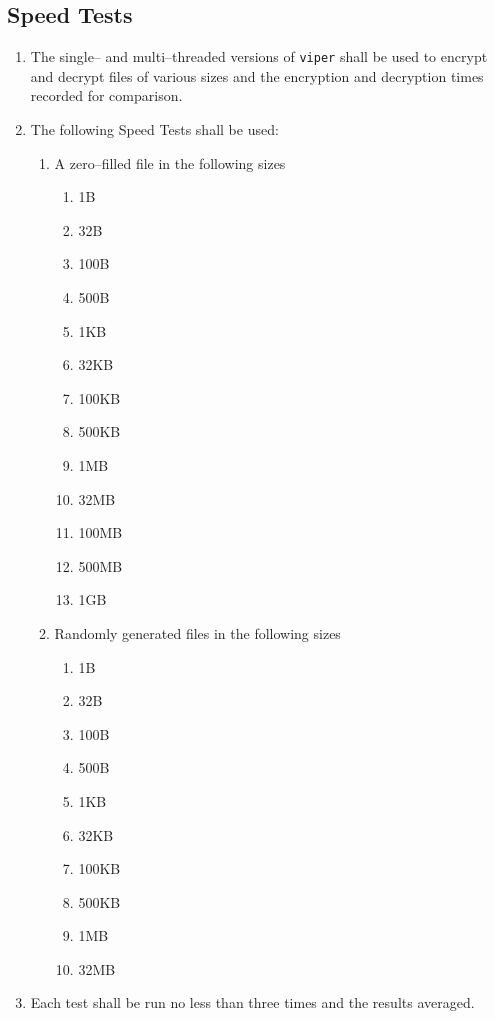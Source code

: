 \subsection{Speed Tests}
\begin{enumerate}
\item The single-- and multi--threaded versions of \texttt{viper} shall be used to encrypt and decrypt files of various sizes and the encryption and decryption times recorded for comparison.
\item The following Speed Tests shall be used:
	\begin{enumerate}
	\item A zero--filled file in the following sizes
		\begin{enumerate}
		\item 1B
		\item 32B
		\item 100B
		\item 500B
		\item 1KB
		\item 32KB
		\item 100KB
		\item 500KB
		\item 1MB
		\item 32MB
		\item 100MB
		\item 500MB
		\item 1GB
		\end{enumerate}
	\item Randomly generated files in the following sizes
		\begin{enumerate}
		\item 1B
		\item 32B
		\item 100B
		\item 500B
		\item 1KB
		\item 32KB
		\item 100KB
		\item 500KB
		\item 1MB
		\item 32MB
		\end{enumerate}
	\end{enumerate}
\item Each test shall be run no less than three times and the results averaged.
\end{enumerate}
